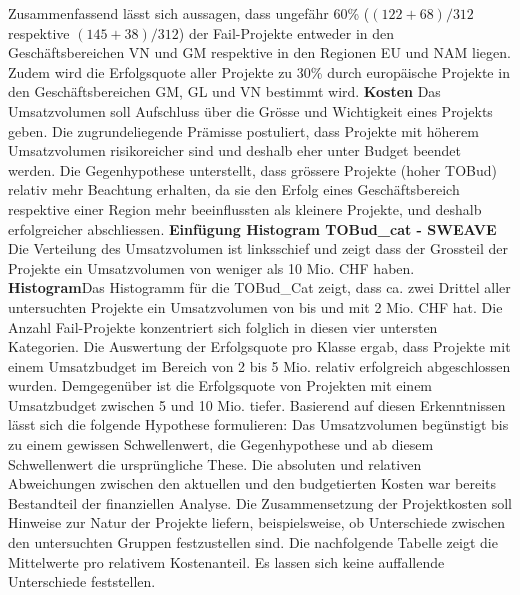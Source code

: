 Zusammenfassend lässt sich aussagen, dass ungefähr 60\% ($(122+68)/312$ respektive $(145+38)/312$) der Fail-Projekte entweder in den Geschäftsbereichen VN und GM respektive in den Regionen EU und NAM liegen. Zudem wird die Erfolgsquote aller Projekte zu 30\% durch europäische Projekte in den Geschäftsbereichen GM, GL und VN bestimmt wird. 
\newline\newline\textbf{Kosten} Das Umsatzvolumen soll Aufschluss über die Grösse und Wichtigkeit eines Projekts geben. Die zugrundeliegende Prämisse postuliert, dass Projekte mit höherem Umsatzvolumen risikoreicher sind und deshalb eher unter Budget beendet werden. Die Gegenhypothese unterstellt, dass grössere Projekte (hoher TOBud) relativ mehr Beachtung erhalten, da sie den Erfolg eines Geschäftsbereich respektive einer Region mehr beeinflussten als kleinere Projekte, und deshalb erfolgreicher abschliessen.
\newline\textbf{Einfügung Histogram TOBud\_cat - SWEAVE}
\newline
Die Verteilung des Umsatzvolumen ist linksschief und zeigt dass der Grossteil der Projekte ein Umsatzvolumen von weniger als 10 Mio. CHF haben.
\newline\textbf{Histogram}Das Histogramm für die TOBud\_Cat zeigt, dass ca. zwei Drittel aller untersuchten Projekte ein Umsatzvolumen von bis und mit 2 Mio. CHF hat. Die Anzahl Fail-Projekte konzentriert sich folglich in diesen vier untersten Kategorien. Die Auswertung der Erfolgsquote pro Klasse ergab, dass Projekte mit einem Umsatzbudget im Bereich von 2 bis 5 Mio. relativ erfolgreich abgeschlossen wurden. Demgegenüber ist die Erfolgsquote von Projekten mit einem Umsatzbudget zwischen 5 und 10 Mio. tiefer. Basierend auf diesen Erkenntnissen lässt sich die folgende Hypothese formulieren: Das Umsatzvolumen begünstigt bis zu einem gewissen Schwellenwert, die Gegenhypothese und ab diesem Schwellenwert die ursprüngliche These.
\newline\newline Die absoluten und relativen Abweichungen zwischen den aktuellen und den budgetierten Kosten war bereits Bestandteil der finanziellen Analyse.
\newline\newline Die Zusammensetzung der Projektkosten soll Hinweise zur Natur der Projekte liefern, beispielsweise, ob Unterschiede zwischen den untersuchten Gruppen festzustellen sind. Die nachfolgende Tabelle zeigt die Mittelwerte pro relativem Kostenanteil. Es lassen sich keine auffallende Unterschiede feststellen.
